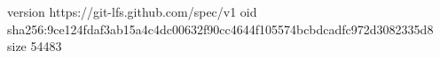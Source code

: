 version https://git-lfs.github.com/spec/v1
oid sha256:9ce124fdaf3ab15a4c4dc00632f90cc4644f105574bcbdcadfc972d3082335d8
size 54483
